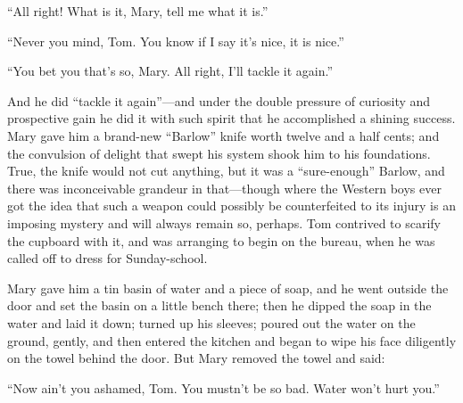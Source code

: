 \documentclass{book}
\begin{document}
“All right! What is it, Mary, tell me what it is.”

“Never you mind, Tom. You know if I say it’s nice, it is nice.”

“You bet you that’s so, Mary. All right, I’ll tackle it again.”

And he did “tackle it again”—and under the double pressure of curiosity and prospective gain he did it with such spirit that he accomplished a shining success. Mary gave him a brand-new “Barlow” knife worth twelve and a half cents; and the convulsion of delight that swept his system shook him to his foundations. True, the knife would not cut anything, but it was a “sure-enough” Barlow, and there was inconceivable grandeur in that—though where the Western boys ever got the idea that such a weapon could possibly be counterfeited to its injury is an imposing mystery and will always remain so, perhaps. Tom contrived to scarify the cupboard with it, and was arranging to begin on the bureau, when he was called off to dress for Sunday-school.

Mary gave him a tin basin of water and a piece of soap, and he went outside the door and set the basin on a little bench there; then he dipped the soap in the water and laid it down; turned up his sleeves; poured out the water on the ground, gently, and then entered the kitchen and began to wipe his face diligently on the towel behind the door. But Mary removed the towel and said:

“Now ain’t you ashamed, Tom. You mustn’t be so bad. Water won’t hurt you.”
\end{document}
